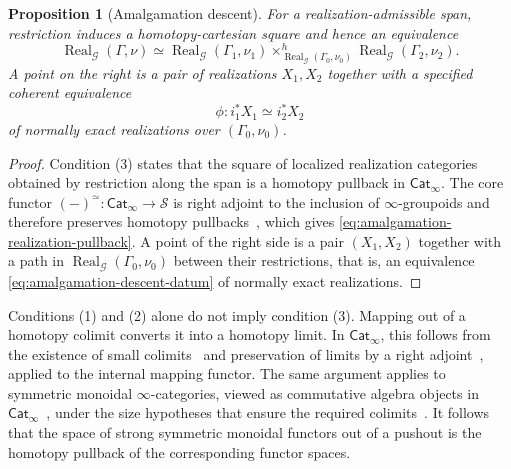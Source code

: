 \documentclass[11pt,letterpaper,twoside]{article}
\theoremstyle{plain}
\newtheorem{proposition}[theorem]{Proposition}
\theoremstyle{definition}
\theoremstyle{remark}
\let\cite\citep
\newcommand{\Real}{\operatorname{Real}}
\begin{document}
\begin{proposition}[Amalgamation descent]\label{prop:amalgamation-descent}
For a realization-admissible span, restriction induces a homotopy-cartesian square and hence an equivalence
\begin{equation}\label{eq:amalgamation-realization-pullback}
 \Real_{\mathcal G}(\Gamma,\nu)
 \simeq
 \Real_{\mathcal G}(\Gamma_1,\nu_1)
 \times^{h}_{\Real_{\mathcal G}(\Gamma_0,\nu_0)}
 \Real_{\mathcal G}(\Gamma_2,\nu_2).
\end{equation}
A point on the right is a pair of realizations $X_1,X_2$ together with a specified coherent equivalence
\begin{equation}\label{eq:amalgamation-descent-datum}
 \phi:i_1^*X_1\simeq i_2^*X_2
\end{equation}
of normally exact realizations over $(\Gamma_0,\nu_0)$.
\end{proposition}

\begin{proof}
Condition (3) states that the square of localized realization categories obtained by restriction along the span is a homotopy pullback in \(\mathsf{Cat}_\infty\).  The core functor \((-)^{\simeq}:\mathsf{Cat}_\infty\to\mathcal S\) is right adjoint to the inclusion of \(\infty\)-groupoids and therefore preserves homotopy pullbacks~\cite[Prop.~5.2.3.5]{lurie2009htt}, which gives \eqref{eq:amalgamation-realization-pullback}.  A point of the right side is a pair \((X_1,X_2)\) together with a path in \(\Real_{\mathcal G}(\Gamma_0,\nu_0)\) between their restrictions, that is, an equivalence \eqref{eq:amalgamation-descent-datum} of normally exact realizations.
\end{proof}

Conditions (1) and (2) alone do not imply condition (3).  Mapping out of a homotopy colimit converts it into a homotopy limit.  In \(\mathsf{Cat}_\infty\), this follows from the existence of small colimits~\cite[Cor.~4.2.4.8]{lurie2009htt} and preservation of limits by a right adjoint~\cite[Prop.~5.2.3.5]{lurie2009htt}, applied to the internal mapping functor.  The same argument applies to symmetric monoidal \(\infty\)-categories, viewed as commutative algebra objects in \(\mathsf{Cat}_\infty\)~\cite[Rem.~2.4.2.6]{lurie2017ha}, under the size hypotheses that ensure the required colimits~\cite[Cor.~3.2.3.3]{lurie2017ha}.  It follows that the space of strong symmetric monoidal functors out of a pushout is the homotopy pullback of the corresponding functor spaces.
\end{document}

